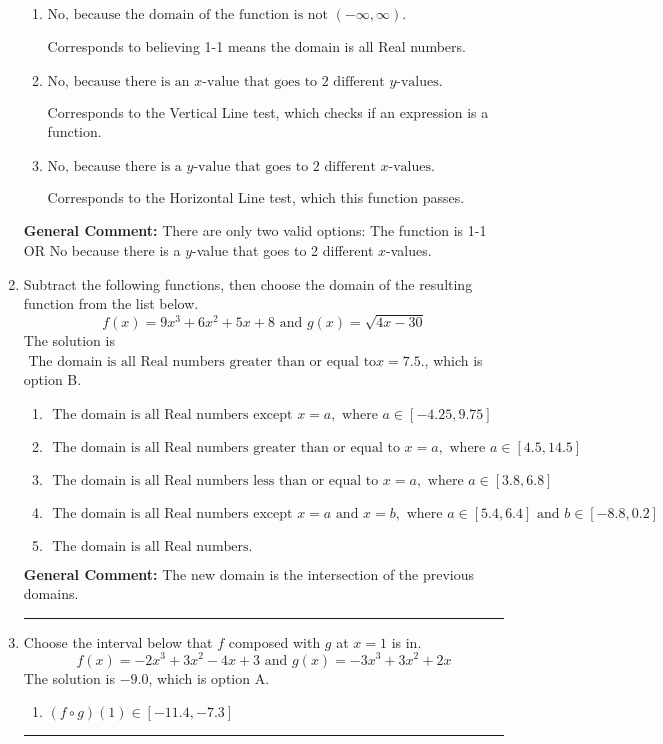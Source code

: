 \documentclass{extbook}[14pt]
\newcommand{\litem}[1]{\item #1

\rule{\textwidth}{0.4pt}}
\begin{document}
\begin{enumerate}
{\begin{enumerate}[label=\Alph*.]
* This is the solution.
\item \( \text{No, because the domain of the function is not $(-\infty, \infty)$.} \)

Corresponds to believing 1-1 means the domain is all Real numbers.
\item \( \text{No, because there is an $x$-value that goes to 2 different $y$-values.} \)

Corresponds to the Vertical Line test, which checks if an expression is a function.
\item \( \text{No, because there is a $y$-value that goes to 2 different $x$-values.} \)

Corresponds to the Horizontal Line test, which this function passes.
\end{enumerate}

\textbf{General Comment:} There are only two valid options: The function is 1-1 OR No because there is a $y$-value that goes to 2 different $x$-values.
}
\litem{
Subtract the following functions, then choose the domain of the resulting function from the list below.
\[ f(x) = 9x^{3} +6 x^{2} +5 x + 8 \text{ and } g(x) = \sqrt{4x-30}  \]The solution is \( \text{ The domain is all Real numbers greater than or equal to} x = 7.5. \), which is option B.\begin{enumerate}[label=\Alph*.]
\item \( \text{ The domain is all Real numbers except } x = a, \text{ where } a \in [-4.25, 9.75] \)


\item \( \text{ The domain is all Real numbers greater than or equal to } x = a, \text{ where } a \in [4.5, 14.5] \)


\item \( \text{ The domain is all Real numbers less than or equal to } x = a, \text{ where } a \in [3.8, 6.8] \)


\item \( \text{ The domain is all Real numbers except } x = a \text{ and } x = b, \text{ where } a \in [5.4, 6.4] \text{ and } b \in [-8.8, 0.2] \)


\item \( \text{ The domain is all Real numbers. } \)


\end{enumerate}

\textbf{General Comment:} The new domain is the intersection of the previous domains.
}
\litem{
Choose the interval below that $f$ composed with $g$ at $x=1$ is in.
\[ f(x) = -2x^{3} +3 x^{2} -4 x + 3 \text{ and } g(x) = -3x^{3} +3 x^{2} +2 x \]The solution is \( -9.0 \), which is option A.\begin{enumerate}[label=\Alph*.]
\item \( (f \circ g)(1) \in [-11.4, -7.3] \)


\end{enumerate}}
\end{enumerate}
\end{document}
